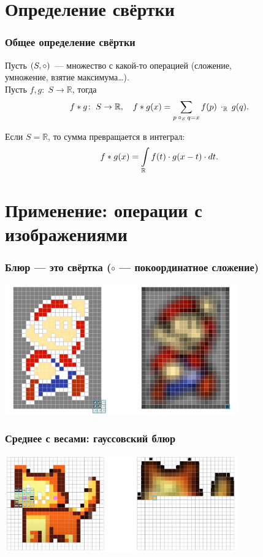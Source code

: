 \documentclass[11pt,aspectratio=169,svgnames]{beamer}
\DeclarePairedDelimiter{\lr}{(}{)}
\newcommand{\br}{\mathbb{R}}
\begin{document}
\section{Определение свёртки}

\begin{frame} \frametitle{Общее определение свёртки}
Пусть \(\lr*{S, \circ}\)~— множество с какой-то операцией (сложение, \\
умножение, взятие максимума\ldots). \\
Пусть \(f, g \colon\; S \to \br\), тогда
	\[ f * g \colon\; S \to \br,\quad
	   f * g \lr*{x} = \sum_{p\:\circ_S\: q = x} f(p)\:\cdot_\br\: g(q). \] \pause

Если \(S = \br\), то сумма превращается в интеграл:
	\[ f * g \lr*{x} = \int\limits_\br f(t) \cdot g(x-t) \cdot dt.\]
\end{frame}

\section{Применение: операции с изображениями}

\begin{frame} \frametitle{Блюр — это свёртка (\(\circ\) — покоординатное сложение)}
	\begin{center}
	   \includegraphics[width=0.75\textwidth]{img/conv-blur}
	\end{center}
\end{frame}

\begin{frame} \frametitle{Среднее с весами: гауссовский блюр}
	\begin{center}
	   \includegraphics[width=0.75\textwidth]{img/conv-gaussian}
	\end{center}
\end{frame}
\end{document}
